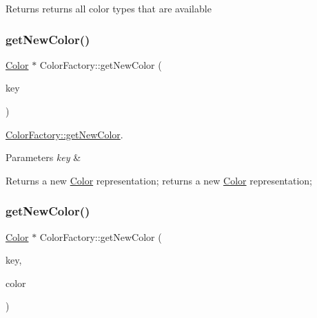 \begin{DoxyReturn}{Returns}
returns all color types that are available 
\end{DoxyReturn}
\mbox{\label{class_color_factory_a0b8412fa33dd5eaefff38412a96fc638}} 
\subsubsection{\texorpdfstring{get\+New\+Color()}{getNewColor()}\hspace{0.1cm}{\footnotesize\ttfamily [1/2]}}
{\footnotesize\ttfamily \hyperlink{class_color}{Color} $\ast$ Color\+Factory\+::get\+New\+Color (\begin{DoxyParamCaption}\item[{const Q\+String \&}]{key }\end{DoxyParamCaption})\hspace{0.3cm}{\ttfamily [static]}}



\hyperlink{class_color_factory_a0b8412fa33dd5eaefff38412a96fc638}{Color\+Factory\+::get\+New\+Color}. 


\begin{DoxyParams}{Parameters}
{\em key} & \\
\hline
\end{DoxyParams}
\begin{DoxyReturn}{Returns}
a new \hyperlink{class_color}{Color} representation; returns a new \hyperlink{class_color}{Color} representation; 
\end{DoxyReturn}
\mbox{\label{class_color_factory_a1fcc2e8e07462cd0932317144c712c86}} 
\subsubsection{\texorpdfstring{get\+New\+Color()}{getNewColor()}\hspace{0.1cm}{\footnotesize\ttfamily [2/2]}}
{\footnotesize\ttfamily \hyperlink{class_color}{Color} $\ast$ Color\+Factory\+::get\+New\+Color (\begin{DoxyParamCaption}\item[{const Q\+String \&}]{key,  }\item[{const \hyperlink{class_color}{Color} $\ast$}]{color }\end{DoxyParamCaption})\hspace{0.3cm}{\ttfamily [static]}}



